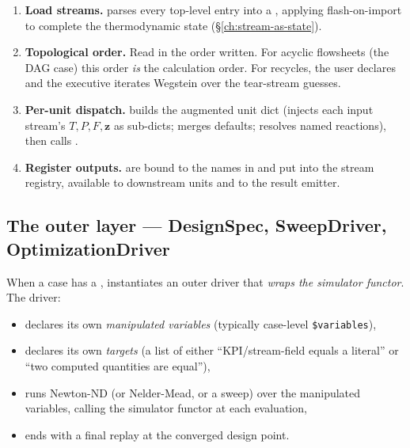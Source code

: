 \documentclass[11pt,a4paper]{article}
\newcommand{\zv}{\mathbf{z}}
\begin{document}
\begin{enumerate}[leftmargin=*,nosep,topsep=2pt]
  \item \textbf{Load streams.}   parses
        every top-level  entry into a
        , applying flash-on-import to complete
        the thermodynamic state (\S\ref{ch:stream-as-state}).
  \item \textbf{Topological order.}  Read  in
        the order written.  For acyclic flowsheets (the DAG case)
        this order \emph{is} the calculation order.  For recycles,
        the user declares  and the
        executive iterates Wegstein over the tear-stream guesses.
  \item \textbf{Per-unit dispatch.}   builds the
        augmented unit dict (injects each input stream's
        $T,P,F,\zv$ as sub-dicts; merges  defaults;
        resolves named reactions), then calls
        .
  \item \textbf{Register outputs.}   are
        bound to the names in  and put into
        the stream registry, available to downstream units and to
        the result emitter.
\end{enumerate}

\subsection{The outer layer --- DesignSpec, SweepDriver,
            OptimizationDriver}

When a case has a , 
instantiates an outer driver that \emph{wraps the simulator
functor}.  The driver:

\begin{itemize}[leftmargin=*,nosep,topsep=2pt]
  \item declares its own \emph{manipulated variables} (typically
        case-level \texttt{\$variables}),
  \item declares its own \emph{targets} (a list of either
        ``KPI/stream-field equals a literal'' or ``two computed
        quantities are equal''),
  \item runs Newton-ND (or Nelder-Mead, or a sweep) over the
        manipulated variables, calling the simulator functor at
        each evaluation,
  \item ends with a final replay at the converged design point.
\end{itemize}
\end{document}
